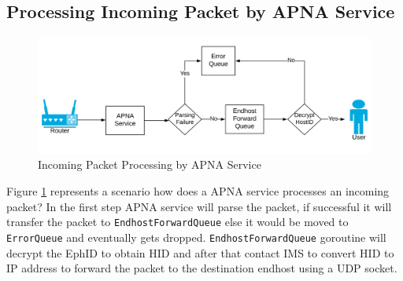 \subsection{Processing Incoming Packet by APNA Service}  \label{apna_service:in}
\begin{figure}[th!!]
\centering
\includegraphics[scale=0.24]{Figures/svc_out.png}
\decoRule
\caption[APNA Service Incoming Packet]{Incoming Packet Processing by APNA Service}
\label{fig:apna_svc_in}
\end{figure}
Figure \ref{fig:apna_svc_in} represents a scenario how does a APNA service processes an incoming packet? In the first step APNA service will parse the packet, if successful it will transfer the packet to \texttt{EndhostForwardQueue} else it would be moved to \texttt{ErrorQueue} and eventually gets dropped. \texttt{EndhostForwardQueue} goroutine will decrypt the EphID to obtain HID and after that contact IMS to convert HID to IP address to forward the packet to the destination endhost using a UDP socket.

